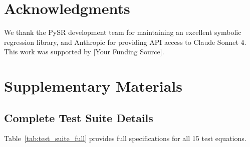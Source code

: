\documentclass[twoside,11pt]{article}
\begin{document}
\section*{Acknowledgments}

We thank the PySR development team for maintaining an excellent symbolic regression library, and Anthropic for providing API access to Claude Sonnet 4. This work was supported by [Your Funding Source].




\appendix

\section{Supplementary Materials}

\subsection{Complete Test Suite Details}

Table~\ref{tab:test_suite_full} provides full specifications for all 15 test equations.
\end{document}
